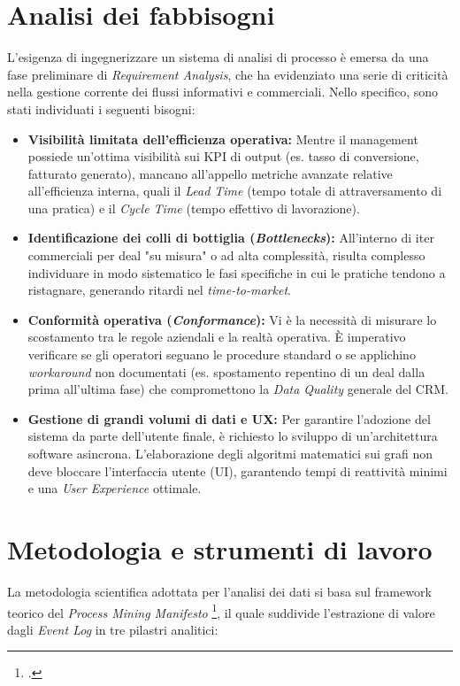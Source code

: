 \documentclass[12pt, a4paper]{report}
\begin{document}
\section*{Analisi dei fabbisogni}
L'esigenza di ingegnerizzare un sistema di analisi di processo è emersa da una fase preliminare di \textit{Requirement Analysis}, che ha evidenziato una serie di criticità nella gestione corrente dei flussi informativi e commerciali. Nello specifico, sono stati individuati i seguenti bisogni:

\begin{itemize}
    \item \textbf{Visibilità limitata dell'efficienza operativa:} Mentre il management possiede un'ottima visibilità sui KPI di output (es. tasso di conversione, fatturato generato), mancano all'appello metriche avanzate relative all'efficienza interna, quali il \textit{Lead Time} (tempo totale di attraversamento di una pratica) e il \textit{Cycle Time} (tempo effettivo di lavorazione).
    \item \textbf{Identificazione dei colli di bottiglia (\textit{Bottlenecks}):} All'interno di iter commerciali per deal "su misura" o ad alta complessità, risulta complesso individuare in modo sistematico le fasi specifiche in cui le pratiche tendono a ristagnare, generando ritardi nel \textit{time-to-market}.
    \item \textbf{Conformità operativa (\textit{Conformance}):} Vi è la necessità di misurare lo scostamento tra le regole aziendali e la realtà operativa. È imperativo verificare se gli operatori seguano le procedure standard o se applichino \textit{workaround} non documentati (es. spostamento repentino di un deal dalla prima all'ultima fase) che compromettono la \textit{Data Quality} generale del CRM.
    \item \textbf{Gestione di grandi volumi di dati e UX:} Per garantire l'adozione del sistema da parte dell'utente finale, è richiesto lo sviluppo di un'architettura software asincrona. L'elaborazione degli algoritmi matematici sui grafi non deve bloccare l'interfaccia utente (UI), garantendo tempi di reattività minimi e una \textit{User Experience} ottimale.
\end{itemize}

\section*{Metodologia e strumenti di lavoro}
La metodologia scientifica adottata per l'analisi dei dati si basa sul framework teorico del \textit{Process Mining Manifesto} \footcite{vandaalst}, il quale suddivide l'estrazione di valore dagli \textit{Event Log} in tre pilastri analitici:
\end{document}

